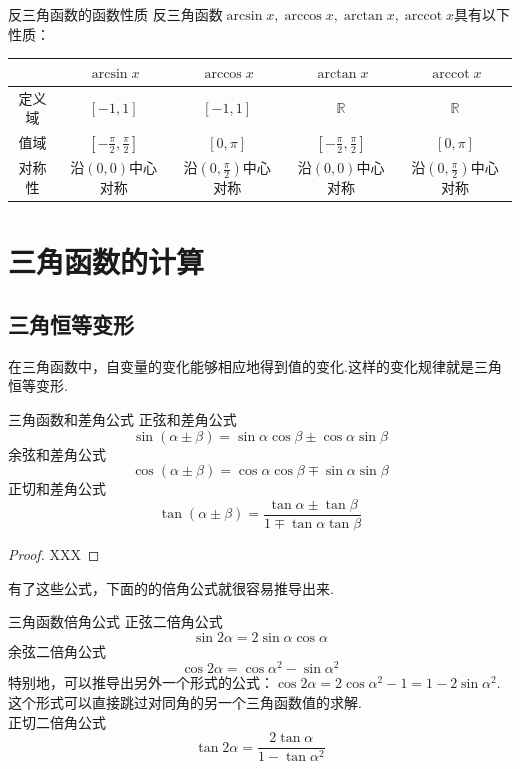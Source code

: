 \documentclass[lang=cn, zihao=5]{elegantbook}
\DeclareMathOperator{\arccot}{arccot}
\begin{document}
\begin{proposition}{反三角函数的函数性质}
    反三角函数$\arcsin{x},\arccos{x},\arctan{x},\arccot{x}$具有以下性质：

    \vspace{1em}
    \centering
    \renewcommand\arraystretch{1.2}
    \begin{tabular}{c|c|c|c|c}
        \hline
          & $\arcsin{x}$ & $\arccos{x}$ & $\arctan{x}$ & $\arccot{x}$ \\ \hline
        定义域 & $[-1,1]$ & $[-1,1]$ & $\mathbb{R}$ & $\mathbb{R}$ \\ \hline
        值域 & $[-\frac{\pi}{2} ,\frac{\pi}{2}]$ & $[0,\pi]$ & $[-\frac{\pi}{2},\frac{\pi}{2}]$ & $[0,\pi]$ \\ \hline
        对称性 & 沿$(0,0)$中心对称 & 沿$(0,\frac{\pi}{2})$中心对称 & 沿$(0,0)$中心对称 & 沿$(0,\frac{\pi}{2})$中心对称 \\ \hline
    \end{tabular}
    
\end{proposition}


\section{三角函数的计算}

\subsection{三角恒等变形}

在三角函数中，自变量的变化能够相应地得到值的变化.这样的变化规律就是三角恒等变形.

\begin{theorem}{三角函数和差角公式} %
    正弦和差角公式$$\sin{(\alpha \pm \beta)}=\sin{\alpha}\cos{\beta} \pm \cos{\alpha}\sin{\beta}$$
    余弦和差角公式$$\cos{(\alpha \pm \beta)}=\cos{\alpha}\cos{\beta} \mp \sin{\alpha}\sin{\beta}$$
    正切和差角公式$$\tan{(\alpha \pm \beta)}=\frac{\tan{\alpha} \pm \tan{\beta}}{1 \mp \tan{\alpha}\tan{\beta}}$$
\end{theorem}
\begin{proof}
    XXX
\end{proof}

有了这些公式，下面的的倍角公式就很容易推导出来.

\begin{proposition}{三角函数倍角公式} %
    正弦二倍角公式$$\sin{2\alpha}=2\sin{\alpha}\cos{\alpha}$$
    余弦二倍角公式$$\cos{2\alpha}=\cos{\alpha ^2}-\sin{\alpha ^2}$$
    特别地，可以推导出另外一个形式的公式：$\cos{2\alpha}=2\cos{\alpha ^2}-1=1-2\sin{\alpha ^2}$.这个形式可以直接跳过对同角的另一个三角函数值的求解.\\
    正切二倍角公式$$\tan{2\alpha}=\frac{2\tan{\alpha}}{1-\tan{\alpha ^2}}$$
\end{proposition}
\end{document}
